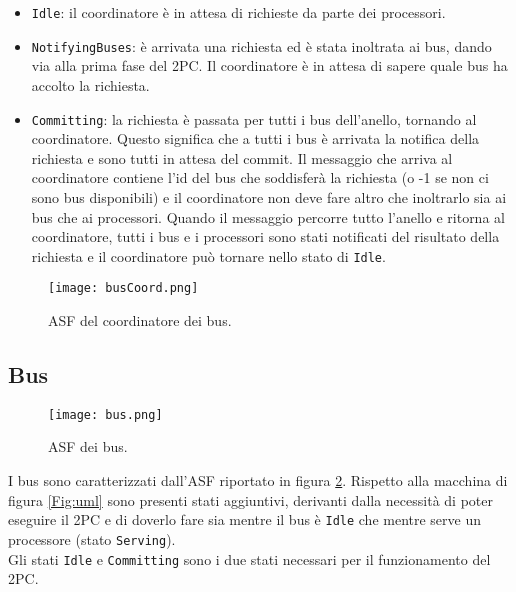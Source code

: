 \begin{itemize}
\item \texttt{Idle}: il coordinatore è in attesa di richieste da parte dei processori.
\item \texttt{NotifyingBuses}: è arrivata una richiesta ed è stata inoltrata ai bus, dando via alla prima fase del 2PC. Il coordinatore è in attesa di sapere quale bus ha accolto la richiesta.
\item \texttt{Committing}: la richiesta è passata per tutti i bus dell'anello, tornando al coordinatore. Questo significa che a tutti i bus è arrivata la notifica della richiesta e sono tutti in attesa del commit. Il messaggio che arriva al coordinatore contiene l'id del bus che soddisferà la richiesta (o -1 se non ci sono bus disponibili) e il coordinatore non deve fare altro che inoltrarlo sia ai bus che ai processori. Quando il messaggio percorre tutto l'anello e ritorna al coordinatore, tutti i bus e i processori sono stati notificati del risultato della richiesta e il coordinatore può tornare nello stato di \texttt{Idle}.
\end{itemize}

\begin{figure}[!hb]
\vspace{-.5cm}
\centerline{\texttt{[image: busCoord.png]}}
\caption{ASF del coordinatore dei bus.}
\label{Fig:coord_fsm}
\vspace{-2cm}
\end{figure}

\pagebreak

\subsection{Bus} 

\begin{figure}[t]
\vspace{-2cm}
\centerline{\texttt{[image: bus.png]}}
\caption{ASF dei bus.}
\label{Fig:bus_fsm}
\end{figure}

I bus sono caratterizzati dall'ASF riportato in figura \ref{Fig:bus_fsm}. Rispetto alla macchina di figura \ref{Fig:uml} sono presenti stati aggiuntivi, derivanti dalla necessità di poter eseguire il 2PC e di doverlo fare sia mentre il bus è \texttt{Idle} che mentre serve un processore (stato \texttt{Serving}). \\


Gli stati \texttt{Idle} e \texttt{Committing} sono i due stati necessari per il funzionamento del 2PC. 

